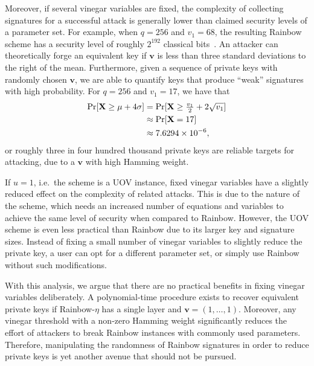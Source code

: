 \documentclass[english]{ufsc-thesis-rn46-2019/ufsc-thesis-rn46-2019}
\theoremstyle{definition}
\begin{document}
Moreover, if several vinegar variables are fixed, the complexity of collecting
signatures for a successful attack is generally lower than claimed security
levels of a parameter set. For example, when $q = 256$ and $v_{1} = 68$, the
resulting Rainbow scheme has a security level of roughly $2^{192}$ classical
bits~\cite[p.~36]{Ding:201901}. An attacker can theoretically forge an
equivalent key if $\mathbf{v}$ is less than three standard deviations to the
right of the mean. Furthermore, given a sequence of private keys with randomly
chosen $\mathbf{v}$, we are able to quantify keys that produce ``weak''
signatures with high probability. For $q = 256$ and $v_{1} = 17$, we have that
\begin{align*}
  \begin{split}
    \Pr[\mathbf{X} \geq \mu + 4\sigma]
      &=       \Pr[\mathbf{X} \geq \tfrac{v_{1}}{2} + 2 \sqrt{v_{1}}] \\
      &\approx \Pr[\mathbf{X} = 17] \\
      &\approx \num[round-mode=places,round-precision=4]{7.62939453125E-6},
  \end{split}
\end{align*}
or roughly three in four hundred thousand private keys are reliable targets
for attacking, due to a $\mathbf{v}$ with high Hamming weight.

If $u = 1$, i.e.\ the scheme is a UOV instance, fixed vinegar variables have
a slightly reduced effect on the complexity of related attacks. This is due to
the nature of the scheme, which needs an increased number of equations and
variables to achieve the same level of security when compared to
Rainbow. However, the UOV scheme is even less practical than Rainbow due to its
larger key and signature sizes. Instead of fixing a small number of vinegar
variables to slightly reduce the private key, a user can opt for a different
parameter set, or simply use Rainbow without such modifications.

With this analysis, we argue that there are no practical benefits in fixing
vinegar variables deliberately. A polynomial-time procedure exists to recover
equivalent private keys if Rainbow-$\eta$ has a single layer and
$\mathbf{v} = (1, \dots, 1)$. Moreover, any vinegar threshold with a non-zero
Hamming weight significantly reduces the effort of attackers to break Rainbow
instances with commonly used parameters. Therefore, manipulating the randomness
of Rainbow signatures in order to reduce private keys is yet another avenue
that should not be pursued.
\end{document}
